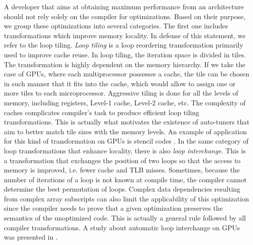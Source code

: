 A developer that aims at obtaining maximum performance from an architecture
should not rely solely on the compiler for optimizations. Based on their
purpose, we group these optimizations into several categories. The first one
includes transformations which improve memory locality. In defense of this
statement, we refer to the loop tiling. \textit{Loop tiling} is a loop
reordering transformation primarily used to improve cache reuse. In loop tiling, the
iteration space is divided in tiles. The transformation is highly dependent on
the memory hierarchy. If we take the case of GPUs, where each multiprocessor
possesses a cache, the tile can be chosen in such manner that it fits into the
cache, which would allow to assign one or more tiles to each microprocessor.
Aggressive tiling is done for all the levels of memory, including registers,
Level-1 cache, Level-2 cache, etc. The complexity of caches complicates
compiler's task to produce efficient loop tiling transformations.
This is actually what motivates the existence of auto-tuners that aim to better
match tile sizes with the memory levels. An example of application for this
kind of transformation on GPUs is stencil codes \cite{volkov2010}. In the same
category of loop transformations that enhance locality, there is also
\textit{loop interchange}. This is a transformation that exchanges the position
of two loops so that the access to memory is improved, i.e. fewer cache and TLB
misses. Sometimes, because the number of iterations of a loop is not known at
compile time, the compiler cannot determine the best permutation of loops.
Complex data dependencies resulting from complex array subscripts can also limit
the applicability of this optimization since the compiler needs to prove that a
given optimization preserves the semantics of the unoptimized code. This is
actually a general rule followed by all compiler transformations. A study about
automatic loop interchange on GPUs was presented in
\cite{Leung:2009:APG:1596655.1596670}.

